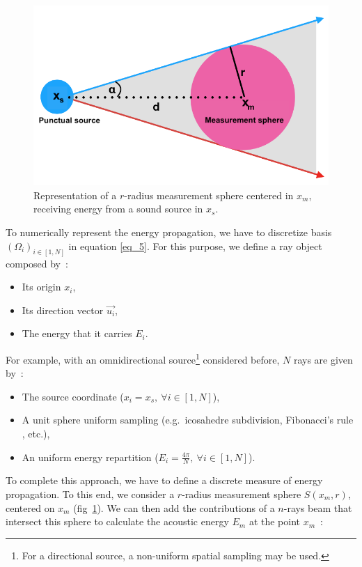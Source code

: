 \documentclass{aes2e}
\begin{document}
\begin{figure}[t]
\centering
	\includegraphics[width=\linewidth]{schema_rayon}
	\caption{Representation of a $r$-radius measurement sphere centered in $x_m$, receiving energy from a sound source in $x_s$.}
	\label{schema_rayon}
\end{figure}

To numerically represent the energy propagation, we have to discretize basis $(\Omega_i)_{i\in[1,N] }$ in equation \ref{eq_5}. For this purpose, we define a ray object composed by~:
\begin{itemize}
\item Its origin $x_i$,
\item Its direction vector $\overrightarrow{u_i}$,
\item The energy that it carries $E_i$.
\end{itemize}

For example, with an omnidirectional source\footnote{For a directional source, a non-uniform spatial sampling may be used.} considered before, $N$ rays are given by~:
\begin{itemize}
\item The source coordinate ($x_i = x_s,~\forall i\in[1,N]$),
\item A unit sphere uniform sampling (e.g.~icosahedre subdivision, Fibonacci's rule \cite{fibonacci}, etc.),
\item An uniform energy repartition ($E_i = \frac{4\pi}{N},~\forall i\in[1,N]$).
\end{itemize}

To complete this approach, we have to define a discrete measure of energy propagation. To this end, we consider a $r$-radius measurement sphere $S(x_m, r)$, centered on $x_m$ (fig~\ref{schema_rayon}).  We can then add the contributions of a $n$-rays  beam that intersect this sphere to calculate the acoustic energy $E_m$ at the point $x_m$~:
\end{document}
